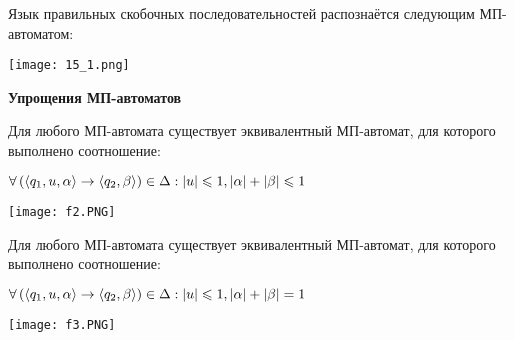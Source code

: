 \Example Язык правильных скобочных последовательностей распознаётся следующим МП-автоматом:

\begin{center}
\texttt{[image: 15\_1.png]}
\end{center}

\textbf{Упрощения МП-автоматов}

\Statement Для любого МП-автомата существует эквивалентный МП-автомат, для которого выполнено соотношение:

\begin{center}
    $\forall \left({\langle q_1, u, \alpha \rangle \rightarrow \langle q_2, \beta \rangle}\right) \in \Delta : |u| \leqslant 1, |\alpha| + |\beta| \leqslant 1$
\end{center}

\Proof

\begin{center}
\texttt{[image: f2.PNG]}
\end{center}

\EndProof

\Statement Для любого МП-автомата существует эквивалентный МП-автомат, для которого выполнено соотношение:

\begin{center}
    $\forall \left({\langle q_1, u, \alpha \rangle \rightarrow \langle q_2, \beta \rangle}\right) \in \Delta : |u| \leqslant 1, |\alpha| + |\beta| = 1$
\end{center}

\Proof

\begin{center}
\texttt{[image: f3.PNG]}
\end{center}

\EndProof
